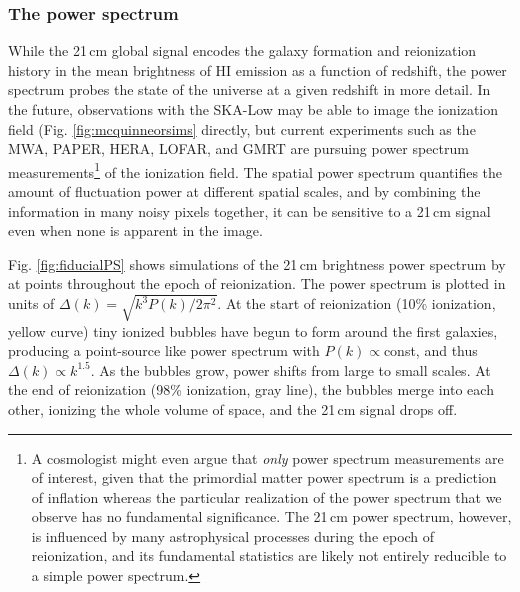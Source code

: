 \subsubsection{The power spectrum}

While the 21\,cm global signal encodes the galaxy formation and reionization history in the mean brightness of HI emission as a function of redshift, the power spectrum probes the state of the universe at a given redshift in more detail. In the  future, observations with the SKA-Low may be able to image the ionization field (Fig. \ref{fig:mcquinneorsims} directly, but current experiments such as the MWA, PAPER, HERA, LOFAR, and GMRT are pursuing power spectrum measurements\footnote{A cosmologist might even argue that \textit{only} power spectrum measurements are of interest, given that the primordial matter power spectrum is a prediction of inflation whereas the particular realization of the power spectrum that we observe has no fundamental significance. The 21\,cm power spectrum, however, is influenced by many astrophysical processes during the epoch of reionization, and its fundamental statistics are likely not entirely reducible to a simple power spectrum.} of the ionization field. The spatial power spectrum quantifies the amount of fluctuation power at different spatial scales, and by combining the information in many noisy pixels together, it can be sensitive to a 21\,cm signal even when none is apparent in the image. 

Fig. \ref{fig:fiducialPS} shows simulations of the 21\,cm brightness power spectrum by \citet{BarkanaPS2009} at points throughout the epoch of reionization. The power spectrum is plotted in units of $\Delta(k)=\sqrt{k^3 P(k)/2\pi^2}$. At the start of reionization (10\% ionization, yellow curve) tiny ionized bubbles have begun to form around the first galaxies, producing a point-source like power spectrum with $P(k)\propto$const, and thus $\Delta(k)\propto k^{1.5}$. As the bubbles grow, power shifts from large to small scales. At the end of reionization (98\% ionization, gray line), the bubbles merge into each other, ionizing the whole volume of space, and the 21\,cm signal drops off.

